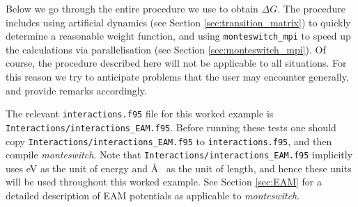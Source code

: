 \documentclass{report}
\begin{document}
Below we go through the entire procedure we use to obtain $\Delta G$. The procedure includes using artificial dynamics (see Section 
\ref{sec:transition_matrix}) to quickly determine a reasonable weight function, and using \texttt{monteswitch\_mpi} to speed up the calculations
via parallelisation (see Section \ref{sec:monteswitch_mpi}). Of course, the procedure described here will not be applicable to all situations. 
For this reason we try to anticipate problems that the user may encounter generally, and provide remarks accordingly.

The relevant \texttt{interactions.f95} file for this worked example is \texttt{Interactions/interactions\_EAM.f95}.
Before running these tests one should copy \texttt{Interactions/interactions\_EAM.f95} to \texttt{interactions.f95}, and then compile 
\emph{monteswitch}. Note that \texttt{Interactions/interactions\_EAM.f95} implicitly uses eV as the unit of energy and \AA~ as the unit
of length, and hence these units will be used throughout this worked example. See Section \ref{sec:EAM} for a detailed description of
EAM potentials as applicable to \emph{monteswitch}.
\end{document}

